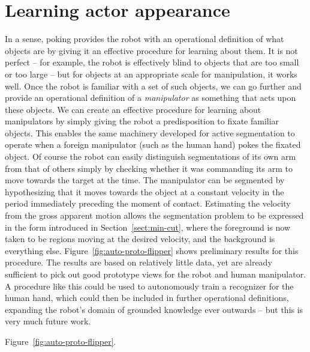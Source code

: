 
\section{Learning actor appearance}


In a sense, poking provides the robot with an operational definition
of what objects are
by giving it an
effective procedure for learning about them.  It is not perfect -- for
example, the robot is effectively blind to objects that are too small
or too large -- but for objects at an appropriate scale for
manipulation, it works well.
Once the robot is familiar with a set of such objects,
we can go further and provide an operational definition of a {\em
manipulator} as something that acts upon these objects.  We can create
an effective procedure for learning about manipulators by simply
giving the robot a predisposition to fixate familiar objects.  This
enables the same machinery developed for active segmentation to
operate when a foreign manipulator (such as the human hand) pokes the
fixated object.  Of course the robot can easily distinguish
segmentations of its own arm from that of others simply by checking
whether it was commanding its arm to move towards the target at the
time.  The manipulator can be segmented by hypothesizing that it moves
towards the object at a constant velocity in the period immediately
preceding the moment of contact.  Estimating the velocity from the
gross apparent motion allows the segmentation problem to be expressed
in the form introduced in Section~\ref{sect:min-cut}, where the
foreground is now taken to be regions moving at the desired velocity,
and the background is everything else.
Figure~\ref{fig:auto-proto-flipper}
shows preliminary results for this procedure.  The results are based on
relatively little data, yet are already
sufficient to pick out good prototype views for the robot and human
manipulator.
A procedure like this could be used to autonomously
train a recognizer for the human hand, which could then
be included in further operational definitions, expanding
the robot's domain of grounded knowledge ever outwards -- but
this is very much future work.

Figure~\ref{fig:auto-proto-flipper}.

